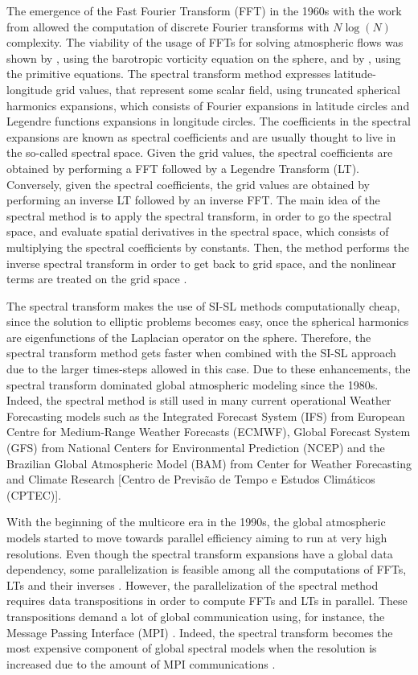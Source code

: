 The emergence of the Fast Fourier Transform (FFT) in the 1960s with the work from 
\citet{cooley:1965} allowed the computation of discrete Fourier transforms with
$N\log(N)$ complexity. 
The viability of the usage of FFTs for solving atmospheric flows was shown by \citet{orszag:1970},
using the barotropic vorticity equation on the sphere, and by \citet{eliasen:1970}, using
the primitive equations.
The spectral transform method expresses latitude-longitude grid values, that represent some scalar field,
using truncated spherical harmonics expansions, which consists of Fourier expansions 
in latitude circles and Legendre functions expansions in longitude circles. 
The coefficients in the spectral expansions are known
as spectral coefficients and are usually thought to live in the so-called spectral space.
Given the grid values, the spectral coefficients are obtained by performing a FFT followed by a 
Legendre Transform (LT). 
Conversely, given the spectral coefficients,
the grid values are obtained by performing an inverse LT followed by an inverse FFT.
The main idea of the spectral method is to apply the spectral transform, in order to 
go the spectral space, and evaluate spatial derivatives in the spectral space, which
consists of multiplying the spectral coefficients by constants. 
Then, the method performs the inverse spectral transform
in order to get back to grid space, and the nonlinear terms are treated on the grid space
\citep{krishnamurti:2006}.

The spectral transform makes the use of SI-SL methods computationally cheap, 
since the solution to elliptic problems becomes easy, once the spherical harmonics are
eigenfunctions of the Laplacian operator on the sphere.
Therefore, the spectral transform method gets faster when combined with the SI-SL approach
due to the larger times-steps allowed in this case.
Due to these enhancements, the spectral transform dominated global atmospheric modeling 
\citep{randall:2018} since the 1980s.
Indeed, the spectral method is still used in many current operational Weather Forecasting models such as
the Integrated Forecast System (IFS) from  European Centre for Medium-Range Weather Forecasts (ECMWF),
Global Forecast System (GFS) from National Centers for Environmental Prediction (NCEP) and the
Brazilian Global Atmospheric Model (BAM) \citep{figueroa:16} from  Center for Weather Forecasting 
and Climate Research [Centro de Previsão de Tempo e Estudos Climáticos (CPTEC)].

With the beginning of the multicore era in the 1990s, the global atmospheric models
started to move towards parallel efficiency aiming to run at very high resolutions. 
Even though the spectral transform expansions have a global data dependency, some parallelization
is feasible among all the computations of FFTs, LTs and their inverses \citep{barros:1995}.
However, the parallelization of the spectral method requires data transpositions in order
to compute FFTs and LTs in parallel.  
These transpositions demand a lot of global communication using, for instance,
the Message Passing Interface (MPI) \citep{zheng:2018}. 
Indeed, the spectral transform becomes the most expensive component of global spectral models
when the resolution is increased due to the amount of MPI communications \citep{mueller:2019}.

